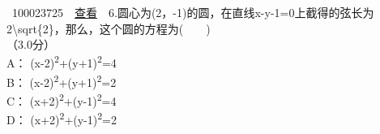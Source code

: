 ~{{100023725}~~\href{../question/viewQuestionDetail.jsp?questionID=100023725\&testPaperId=100229072}{查看}~~6.圆心为(2，-1)的圆，在直线x-y-1=0上截得的弦长为2{\textbackslash{}sqrt\{2\}}，那么，这个圆的方程为(　　)\\
\hspace*{0.333em}\hspace*{0.333em}（3.0分）\\
\hspace*{0.333em}\hspace*{0.333em}\hspace*{0.333em}\hspace*{0.333em}\hspace*{0.333em}\hspace*{0.333em}\hspace*{0.333em}\hspace*{0.333em}A：
(x-2)\textsuperscript{2}+(y+1)\textsuperscript{2}=4\\[2\baselineskip]\hspace*{0.333em}\hspace*{0.333em}\hspace*{0.333em}\hspace*{0.333em}\hspace*{0.333em}\hspace*{0.333em}\hspace*{0.333em}\hspace*{0.333em}B：
(x-2)\textsuperscript{2}+(y+1)\textsuperscript{2}=2\\[2\baselineskip]\hspace*{0.333em}\hspace*{0.333em}\hspace*{0.333em}\hspace*{0.333em}\hspace*{0.333em}\hspace*{0.333em}\hspace*{0.333em}\hspace*{0.333em}C：
(x+2)\textsuperscript{2}+(y-1)\textsuperscript{2}=4\\[2\baselineskip]\hspace*{0.333em}\hspace*{0.333em}\hspace*{0.333em}\hspace*{0.333em}\hspace*{0.333em}\hspace*{0.333em}\hspace*{0.333em}\hspace*{0.333em}D：
(x+2)\textsuperscript{2}+(y-1)\textsuperscript{2}=2\\[2\baselineskip]}

